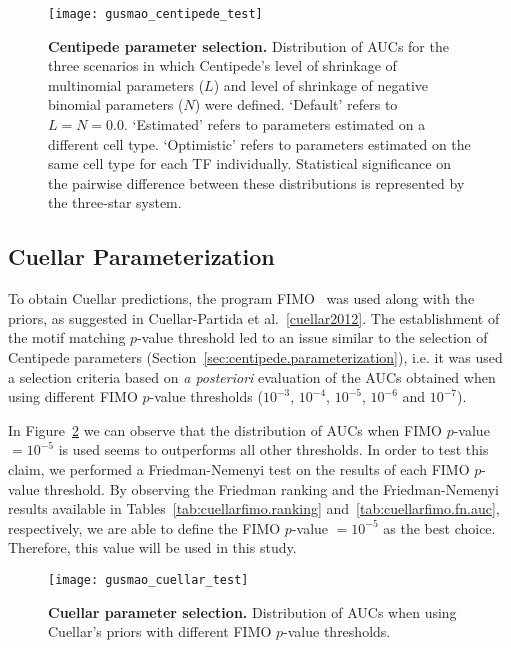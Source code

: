 \begin{figure}[h!]
\centering
\texttt{[image: gusmao\_centipede\_test]}
\caption[Centipede parameter selection]{\textbf{Centipede parameter selection.} Distribution of AUCs for the three scenarios in which Centipede's level of shrinkage of multinomial parameters ($L$) and level of shrinkage of negative binomial parameters ($N$) were defined. `Default' refers to $L = N = 0.0$. `Estimated' refers to parameters estimated on a different cell type. `Optimistic' refers to parameters estimated on the same cell type for each TF individually. Statistical significance on the pairwise difference between these distributions is represented by the three-star system.}
\label{fig:gusmao_centipede_test}
\end{figure}

\subsection{Cuellar Parameterization}
\label{sec:cuellar.parameterization}

To obtain Cuellar predictions, the program FIMO~\cite{grant2011} was used along with the priors, as suggested in Cuellar-Partida et al.~\ref{cuellar2012}. The establishment of the motif matching $p$-value threshold led to an issue similar to the selection of Centipede parameters (Section~\ref{sec:centipede.parameterization}), i.e. it was used a selection criteria based on \emph{a posteriori} evaluation of the AUCs obtained when using different FIMO $p$-value thresholds ($ 10^{-3} $, $ 10^{-4} $, $ 10^{-5} $, $ 10^{-6} $ and $ 10^{-7} $).

In Figure~\ref{fig:gusmao_cuellar_test} we can observe that the distribution of AUCs when FIMO $p$-value $ = 10^{-5}$ is used seems to outperforms all other thresholds. In order to test this claim, we performed a Friedman-Nemenyi test on the results of each FIMO $p$-value threshold. By observing the Friedman ranking and the Friedman-Nemenyi results available in Tables~\ref{tab:cuellarfimo.ranking} and~\ref{tab:cuellarfimo.fn.auc}, respectively, we are able to define the FIMO $p$-value $ = 10^{-5}$ as the best choice. Therefore, this value will be used in this study.

\begin{figure}[h!]
\centering
\texttt{[image: gusmao\_cuellar\_test]}
\caption[Cuellar parameter selection]{\textbf{Cuellar parameter selection.} Distribution of AUCs when using Cuellar's priors with different FIMO $p$-value thresholds.}
\label{fig:gusmao_cuellar_test}
\end{figure}

